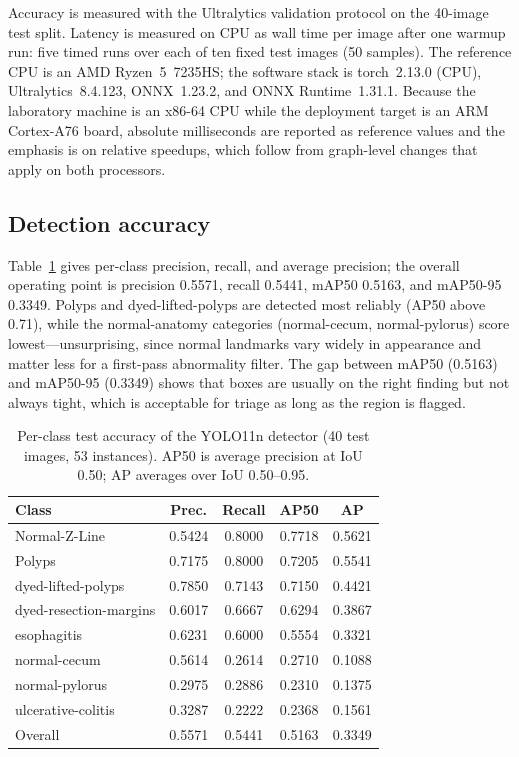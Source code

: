 \documentclass[conference]{IEEEtran}
\begin{document}
Accuracy is measured with the Ultralytics validation protocol on the 40-image
test split. Latency is measured on CPU as wall time per image after one
warmup run: five timed runs over each of ten fixed test images (50 samples).
The reference CPU is an AMD Ryzen~5~7235HS; the software stack is
torch~2.13.0 (CPU), Ultralytics~8.4.123, ONNX~1.23.2, and ONNX
Runtime~1.31.1. Because the laboratory machine is an x86-64 CPU while the
deployment target is an ARM Cortex-A76 board, absolute milliseconds are
reported as reference values and the emphasis is on relative speedups, which
follow from graph-level changes that apply on both processors.

\subsection{Detection accuracy}

Table~\ref{tab:perclass} gives per-class precision, recall, and average
precision; the overall operating point is precision 0.5571, recall 0.5441,
mAP50 0.5163, and mAP50-95 0.3349. Polyps and dyed-lifted-polyps are detected
most reliably (AP50 above 0.71), while the normal-anatomy categories
(normal-cecum, normal-pylorus) score lowest---unsurprising, since normal
landmarks vary widely in appearance and matter less for a first-pass abnormality
filter. The gap between mAP50 (0.5163) and mAP50-95 (0.3349) shows that boxes
are usually on the right finding but not always tight, which is acceptable for
triage as long as the region is flagged.

\begin{table}[t]
\centering
\caption{Per-class test accuracy of the YOLO11n detector (40 test images,
53 instances). AP50 is average precision at IoU 0.50; AP averages over
IoU 0.50--0.95.}
\label{tab:perclass}
\begin{tabular}{|l|c|c|c|c|}
\hline
Class & Prec. & Recall & AP50 & AP \\
\hline
Normal-Z-Line & 0.5424 & 0.8000 & 0.7718 & 0.5621 \\
Polyps & 0.7175 & 0.8000 & 0.7205 & 0.5541 \\
dyed-lifted-polyps & 0.7850 & 0.7143 & 0.7150 & 0.4421 \\
dyed-resection-margins & 0.6017 & 0.6667 & 0.6294 & 0.3867 \\
esophagitis & 0.6231 & 0.6000 & 0.5554 & 0.3321 \\
normal-cecum & 0.5614 & 0.2614 & 0.2710 & 0.1088 \\
normal-pylorus & 0.2975 & 0.2886 & 0.2310 & 0.1375 \\
ulcerative-colitis & 0.3287 & 0.2222 & 0.2368 & 0.1561 \\
\hline
Overall & 0.5571 & 0.5441 & 0.5163 & 0.3349 \\
\hline
\end{tabular}
\end{table}
\end{document}
